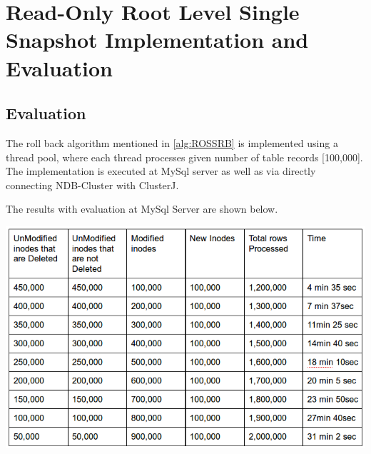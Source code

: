 
%
%
%


\chapter{Read-Only Root Level Single Snapshot Implementation and Evaluation}
\label{ch:RONSIE}




\section{Evaluation}

The roll back algorithm mentioned in \ref{alg:ROSSRB} is implemented using a thread pool, where each thread processes given number of table records [100,000]. The implementation is executed at MySql server as well as via directly connecting NDB-Cluster\cite{29} with ClusterJ\cite{clusterj}. 

The results with evaluation at MySql Server are shown below.\\
\begin{center}
\includegraphics[scale=0.65]{figs/preliminar/MySqlServerSingleSnapshotEval.png}
\label{fig:MySqlServerSSE}%
\end{center}

